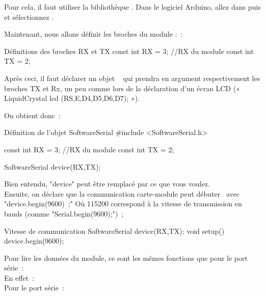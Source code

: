 Pour cela, il faut utiliser la bibliothèque .
Dans le logiciel Arduino, allez dans  puis   et sélectionnez .


Maintenant, nous allons définir les broches du module : :

\begin{Cpp}{Définitions des broches RX et TX}
const int RX = 3; //RX du module
const int TX = 2;
\end{Cpp}

Après ceci, il faut déclarer un objet   qui prendra en argument respectivement les broches TX et Rx, un peu comme lors de la déclaration d'un écran LCD (« LiquidCrystal lcd (RS,E,D4,D5,D6,D7); »).

On obtient donc :

\begin{Cpp}{Définition de l'objet SoftwareSerial}
#include <SoftwareSerial.h>

const int RX = 3; //RX du module
const int TX = 2;

SoftwareSerial device(RX,TX);
\end{Cpp}

Bien entendu, "device" peut être remplacé par ce que vous voulez. \\
Ensuite, on déclare que la communication carte-module peut débuter  avec "device.begin(9600) ;"
Où 115200 correspond à la vitesse de transmission en bauds (comme "Serial.begin(9600);") ;

\begin{Cpp}{Vitesse de communication}
SoftwareSerial device(RX,TX);
void setup() {
    device.begin(9600);
}
\end{Cpp}


Pour lire les données du module, ce sont les mêmes fonctions que pour le port série : \\
En effet : \\

Pour le port série :	\\	

